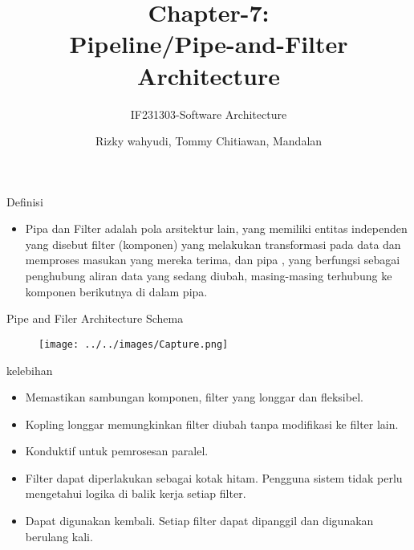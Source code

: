 \documentclass[aspectratio=169, table]{beamer}
\title{\Large Chapter-7:\\Pipeline/Pipe-and-Filter\\Architecture}
\subtitle{IF231303-Software Architecture}
\author{Rizky wahyudi, Tommy Chitiawan, Mandalan}
\begin{document}
	\frame{\titlepage}

	\begin{frame}{Definisi}
        \begin{itemize}
            \item  Pipa dan Filter adalah pola arsitektur lain, yang memiliki entitas independen yang disebut filter (komponen) yang melakukan transformasi pada data dan memproses masukan yang mereka terima, dan pipa , yang berfungsi sebagai penghubung aliran data yang sedang diubah, masing-masing terhubung ke komponen berikutnya di dalam pipa.
        \end{itemize}
    \end{frame}

    \begin{frame}{Pipe and Filer Architecture Schema}
        \begin{figure}[h]
            \centering
            \texttt{[image: ../../images/Capture.png]}
        \end{figure}
    \end{frame}

    \begin{frame}{kelebihan}
        \begin{itemize}
            \item Memastikan sambungan komponen, filter yang longgar dan fleksibel.
            \item Kopling longgar memungkinkan filter diubah tanpa modifikasi ke filter lain.
            \item Konduktif untuk pemrosesan paralel.
            \item Filter dapat diperlakukan sebagai kotak hitam. Pengguna sistem tidak perlu mengetahui logika di balik kerja setiap filter.
            \item Dapat digunakan kembali. Setiap filter dapat dipanggil dan digunakan berulang kali.
        \end{itemize}
    \end{frame}
\end{document}
